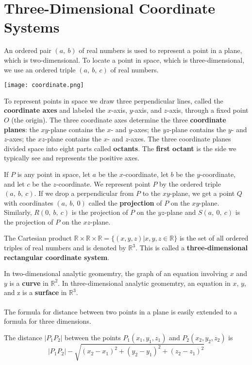 \section{Three-Dimensional Coordinate Systems}
  An ordered pair $(a,\ b)$ of real numbers is used to represent a point in a plane, which is two-dimensional. To locate a point in space, which is three-dimensional, we use an ordered triple $(a,\ b,\ c)$ of real numbers.
  \begin{center}
    \texttt{[image: coordinate.png]}
  \end{center}
  To represent points in space we draw three perpendicular lines, called the \textbf{coordinate axes} and labeled the $x$-axis, $y$-axis, and $z$-axis, through a fixed point $O$ (the origin). The three coordinate axes determine the three \textbf{coordinate planes}: the $xy$-plane contains the $x$- and $y$-axes; the $yz$-plane contains the $y$- and $z$-axes; the $xz$-plane contains the $x$- and $z$-axes. The three coordinate planes divided space into eight parts called \textbf{octants}. The \textbf{first octant} is the side we typically see and represents the positive axes.\par
  If $P$ is any point in space, let $a$ be the $x$-coordinate, let $b$ be the $y$-coordinate, and let $c$ be the $z$-coordinate. We represent point $P$ by the ordered triple $(a,\ b,\ c)$. If we drop a perpendicular from $P$ to the $xy$-plane, we get a point $Q$ with coordinates $(a,\ b,\ 0)$ called the \textbf{projection} of $P$ on the $xy$-plane. Similarly, $R(0,\ b,\ c)$ is the projection of $P$ on the $yz$-plane and $S(a,\ 0,\ c)$ is the projection of $P$ on the $xz$-plane.\par
  The Cartesian product $\mathbb{R} \times \mathbb{R} \times \mathbb{R} = \{(x,y,z)|x,y,z \in \mathbb{R}\}$ is the set of all ordered triples of real numbers and is denoted by $\mathbb{R}^3$. This is called a \textbf{three-dimensional rectangular coordinate system}.\par
  In two-dimensional analytic geomemtry, the graph of an equation involving $x$ and $y$ is a \textbf{curve} in $\mathbb{R}^2$. In three-dimensional analytic geomemtry, an equation in $x$, $y$, and z is a \textbf{surface} in $\mathbb{R}^3$.
  \\~\\
  The formula for distance between two points in a plane is easily extended to a formula for three dimensions.
  \begin{definition}
    The distance $|P_1 P_2|$ between the points $P_1 (x_1,y_1,z_1)$ and $P_2 (x_2,y_2,z_2)$ is
    $$|P_1 P_2| - \sqrt{(x_2 - x_1)^2 + (y_2 - y_1)^2 + (z_2 - z_1)^2}$$
  \end{definition}
